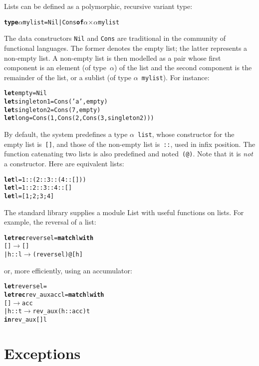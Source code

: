 Lists can be defined as a polymorphic, recursive variant type:
\begin{alltt}
\textbf{type} \(\alpha\) mylist = Nil | Cons \textbf{of} \(\alpha\) \(\times\) \(\alpha\) mylist
\end{alltt}
The data constructors \texttt{Nil} and \texttt{Cons} are traditional
in the community of functional languages. The former denotes the empty
list; the latter represents a non\hyp{}empty list. A non\hyp{}empty
list is then modelled as a pair whose first component is an element
(of type~\(\alpha\)) of the list and the second component is the
remainder of the list, or a sublist (of
type \(\alpha\)~\texttt{mylist}). For instance:
\begin{alltt}
\textbf{let} empty= Nil
\textbf{let} singleton1 = Cons ('a', empty)
\textbf{let} singleton2 = Cons (7, empty)
\textbf{let} long = Cons (1, Cons (2, Cons (3, singleton2)))
\end{alltt}
By default, the \OCaml system predefines a
type \(\alpha\)~\texttt{list}, whose constructor for the empty list
is~\texttt{[]}, and those of the non\hyp{}empty list is~\texttt{::},
used in infix position. The function catenating two lists is also
predefined and noted~\texttt{(@)}. Note that it is \emph{not} a
constructor. Here are equivalent lists:
\begin{alltt}
\textbf{let} l = 1::(2::3::(4::[]))
\textbf{let} l = 1::2::3::4::[]
\textbf{let} l = [1;2;3;4]
\end{alltt}
The standard library supplies a module \textsf{List} with useful
functions on lists. For example, the reversal of a list:
\begin{alltt}
\textbf{let} \textbf{rec} reverse l = \textbf{match} l \textbf{with}
                      [] \(\rightarrow\) []
                    | h::l \(\rightarrow\) (reverse l) @ [h]
\end{alltt}
or, more efficiently, using an accumulator:
\begin{alltt}
\textbf{let} reverse l = 
  \textbf{let rec} rev\_aux acc l = \textbf{match} l \textbf{with}
                            [] \(\rightarrow\) acc
                          | h::t \(\rightarrow\) rev\_aux (h::acc) t
\textbf{in} rev\_aux [] l
\end{alltt}

\section{Exceptions}

